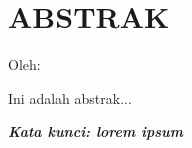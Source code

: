 \clearpage
\chapter*{ABSTRAK}

\begin{center}
  \center
  \begin{singlespace}
    \bfseries \MakeUppercase{\thetitle}

    \normalfont\normalsize
    Oleh:

    \bfseries \theauthor
  \end{singlespace}
\end{center}


\begin{singlespace}
  {{Ini adalah abstrak...}}
  
  \textbf{\textit{Kata kunci: {{lorem ipsum}}}}
\end{singlespace}
\clearpage
